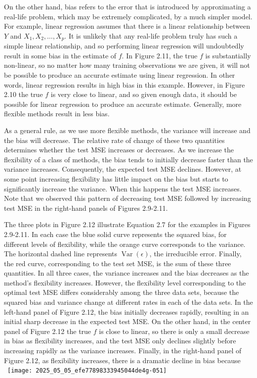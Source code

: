 \documentclass[10pt]{article}
\begin{document}
On the other hand, bias refers to the error that is introduced by approximating a real-life problem, which may be extremely complicated, by a much simpler model. For example, linear regression assumes that there is a linear relationship between $Y$ and $X_{1}, X_{2}, \ldots, X_{p}$. It is unlikely that any real-life problem truly has such a simple linear relationship, and so performing linear regression will undoubtedly result in some bias in the estimate of $f$. In Figure 2.11, the true $f$ is substantially non-linear, so no matter how many training observations we are given, it will not be possible to produce an accurate estimate using linear regression. In other words, linear regression results in high bias in this example. However, in Figure 2.10 the true $f$ is very close to linear, and so given enough data, it should be possible for linear regression to produce an accurate estimate. Generally, more flexible methods result in less bias.

As a general rule, as we use more flexible methods, the variance will increase and the bias will decrease. The relative rate of change of these two quantities determines whether the test MSE increases or decreases. As we increase the flexibility of a class of methods, the bias tends to initially decrease faster than the variance increases. Consequently, the expected test MSE declines. However, at some point increasing flexibility has little impact on the bias but starts to significantly increase the variance. When this happens the test MSE increases. Note that we observed this pattern of decreasing test MSE followed by increasing test MSE in the right-hand panels of Figures 2.9-2.11.

The three plots in Figure 2.12 illustrate Equation 2.7 for the examples in Figures 2.9-2.11. In each case the blue solid curve represents the squared bias, for different levels of flexibility, while the orange curve corresponds to the variance. The horizontal dashed line represents $\operatorname{Var}(\epsilon)$, the irreducible error. Finally, the red curve, corresponding to the test set MSE, is the sum of these three quantities. In all three cases, the variance increases and the bias decreases as the method's flexibility increases. However, the flexibility level corresponding to the optimal test MSE differs considerably among the three data sets, because the squared bias and variance change at different rates in each of the data sets. In the left-hand panel of Figure 2.12, the bias initially decreases rapidly, resulting in an initial sharp decrease in the expected test MSE. On the other hand, in the center panel of Figure 2.12 the true $f$ is close to linear, so there is only a small decrease in bias as flexibility increases, and the test MSE only declines slightly before increasing rapidly as the variance increases. Finally, in the right-hand panel of Figure 2.12, as flexibility increases, there is a dramatic decline in bias because\
\
\texttt{[image: 2025\_05\_05\_efe77898333945044de4g-051]}
\end{document}
